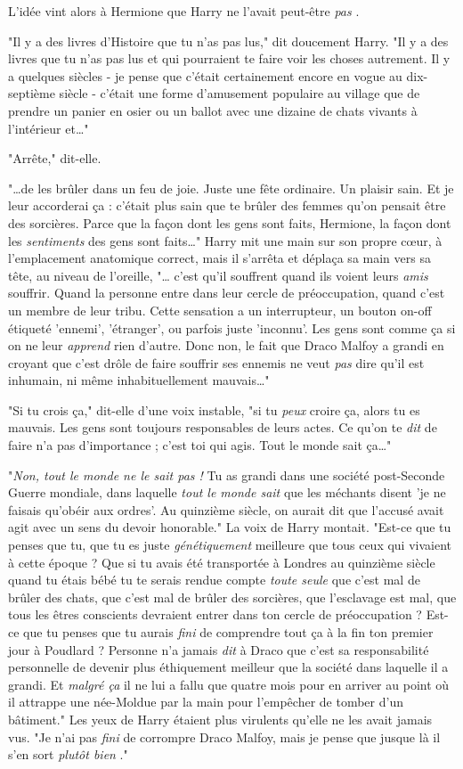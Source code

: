 L'idée vint alors à Hermione que Harry ne l'avait peut-être \emph{pas} .

"Il y a des livres d'Histoire que tu n'as pas lus," dit doucement Harry. "Il y a des livres que tu n'as pas lus et qui pourraient te faire voir les choses autrement. Il y a quelques siècles - je pense que c'était certainement encore en vogue au dix-septième siècle - c'était une forme d'amusement populaire au village que de prendre un panier en osier ou un ballot avec une dizaine de chats vivants à l'intérieur et…"

"Arrête," dit-elle.

"…de les brûler dans un feu de joie. Juste une fête ordinaire. Un plaisir sain. Et je leur accorderai ça : c'était plus sain que te brûler des femmes qu'on pensait être des sorcières. Parce que la façon dont les gens sont faits, Hermione, la façon dont les \emph{sentiments}  des gens sont faits…" Harry mit une main sur son propre cœur, à l'emplacement anatomique correct, mais il s'arrêta et déplaça sa main vers sa tête, au niveau de l'oreille, "… c'est qu'il souffrent quand ils voient leurs \emph{amis}  souffrir. Quand la personne entre dans leur cercle de préoccupation, quand c'est un membre de leur tribu. Cette sensation a un interrupteur, un bouton on-off étiqueté 'ennemi', 'étranger', ou parfois juste 'inconnu'. Les gens sont comme ça si on ne leur \emph{apprend}  rien d'autre. Donc non, le fait que Draco Malfoy a grandi en croyant que c'est drôle de faire souffrir ses ennemis ne veut \emph{pas}  dire qu'il est inhumain, ni même inhabituellement mauvais…"

"Si tu crois ça," dit-elle d'une voix instable, "si tu \emph{peux}  croire ça, alors tu es mauvais. Les gens sont toujours responsables de leurs actes. Ce qu'on te \emph{dit}  de faire n'a pas d'importance ; c'est toi qui agis. Tout le monde sait ça…"

"\emph{Non, tout le monde ne le sait pas !}  Tu as grandi dans une société post-Seconde Guerre mondiale, dans laquelle \emph{tout le monde sait}  que les méchants disent 'je ne faisais qu'obéir aux ordres'. Au quinzième siècle, on aurait dit que l'accusé avait agit avec un sens du devoir honorable." La voix de Harry montait. "Est-ce que tu penses que tu, que tu es juste \emph{génétiquement}  meilleure que tous ceux qui vivaient à cette époque ? Que si tu avais été transportée à Londres au quinzième siècle quand tu étais bébé tu te serais rendue compte \emph{toute seule}  que c'est mal de brûler des chats, que c'est mal de brûler des sorcières, que l'esclavage est mal, que tous les êtres conscients devraient entrer dans ton cercle de préoccupation ? Est-ce que tu penses que tu aurais \emph{fini}  de comprendre tout ça à la fin ton premier jour à Poudlard ? Personne n'a jamais \emph{dit}  à Draco que c'est sa responsabilité personnelle de devenir plus éthiquement meilleur que la société dans laquelle il a grandi. Et \emph{malgré ça}  il ne lui a fallu que quatre mois pour en arriver au point où il attrappe une née-Moldue par la main pour l'empêcher de tomber d'un bâtiment." Les yeux de Harry étaient plus virulents qu'elle ne les avait jamais vus. "Je n'ai pas \emph{fini}  de corrompre Draco Malfoy, mais je pense que jusque là il s'en sort \emph{plutôt bien} ."

